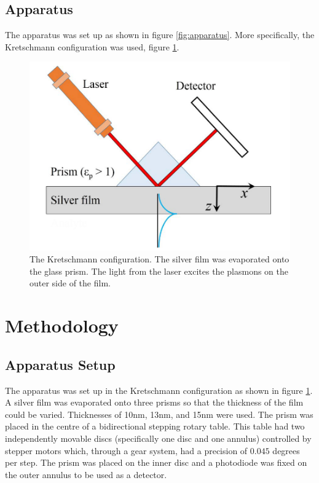 \documentclass[%
reprint,
amsmath,amssymb,
aps,
]{revtex4-2}
\begin{document}
		\subsection{Apparatus}
			The apparatus was set up as shown in figure \ref{fig:apparatus}. More specifically, the Kretschmann configuration was used, figure \ref{fig:kConfig}.
			
			\begin{figure}
				\includegraphics[width=0.9\columnwidth]{kConfig.png}
				\caption{\label{fig:kConfig} The Kretschmann configuration. The silver film was evaporated onto the glass prism. The light from the laser excites the plasmons on the outer side of the film. \cite{opticalApplications}}
			\end{figure}
	 
	\section{Methodology}
		\subsection{Apparatus Setup}
			The apparatus was set up in the Kretschmann configuration as shown in figure \ref{fig:kConfig}. A silver film was evaporated onto three prisms so that the thickness of the film could be varied. Thicknesses of 10nm, 13nm, and 15nm were used. The prism was placed in the centre of a bidirectional stepping rotary table. This table had two independently movable discs (specifically one disc and one annulus) controlled by stepper motors which, through a gear system, had a precision of $0.045$ degrees per step. The prism was placed on the inner disc and a photodiode was fixed on the outer annulus to be used as a detector.\\
			
\end{document}
